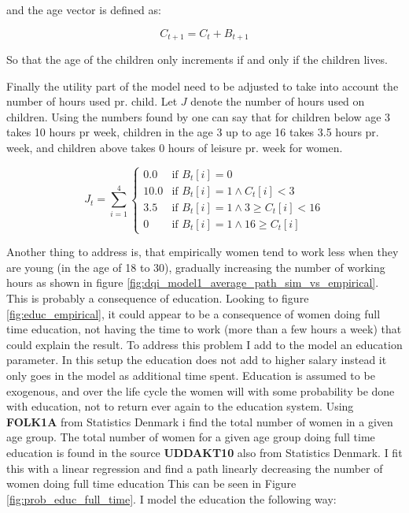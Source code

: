 and the age vector is defined as:

\begin{equation}
    C_{t+1} = C_t + B_{t+1}
\end{equation}

So that the age of the children only increments if and only if the children lives.

Finally the utility part of the model need to be adjusted to take into account the number of hours used pr. child. Let $J$ denote the number of hours used on children. Using the numbers found by \parencite{ekert-jaffe_time_2015} one can say that for children below age 3 takes 10 hours pr week, children in the age 3 up to age 16 takes 3.5 hours pr. week, and children above takes 0 hours of leisure pr. week for women. 

\begin{equation}
    J_t = \sum_{i=1}^4 \begin{cases}
        0.0 & \text{if } B_t[i] = 0 \\
        10.0 & \text{if } B_t[i] = 1 \land C_t[i] < 3 \\
        3.5 & \text{if } B_t[i] = 1 \land 3 \geq C_t[i] < 16 \\
        0 & \text{if } B_t[i] = 1 \land  16 \geq  C_t[i] 
    \end{cases}
\end{equation}

Another thing to address is, that empirically women tend to work less when they are young (in the age of 18 to 30), gradually increasing the number of working hours as shown in figure \ref{fig:dqi_model1_average_path_sim_vs_empirical}. This is probably a consequence of education. Looking to figure \ref{fig:educ_empirical}, it could appear to be a consequence of women doing full time education, not having the time to work (more than a few hours a week) that could explain the result. To address this problem I add to the model an education parameter. In this setup the education does not add to higher salary instead it only goes in the model as additional time spent. Education is assumed to be exogenous, and over the life cycle the women will with some probability be done with education, not to return ever again to the education system. Using \textbf{FOLK1A} from Statistics Denmark i find the total number of women in a given age group. The total number of women for a given age group doing full time education is found in the source \textbf{UDDAKT10} also from Statistics Denmark. I fit this with a linear regression and find a path linearly decreasing the number of women doing full time education This can be seen in Figure \ref{fig:prob_educ_full_time}. I model the education the following way:

